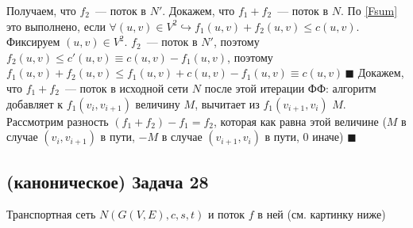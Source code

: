 \documentclass[a4paper]{article}
\begin{document}
Получаем, что $f_2$~--- поток в $N'$. Докажем, что $f_1+f_2$~--- поток в $N$. По \ref{Fsum} это выполнено, если $\forall (u,v)\in V^2\hookrightarrow f_1(u,v)+f_2(u,v)\leqslant c(u,v)$. Фиксируем $(u,v)\in V^2$. $f_2$~--- поток в $N'$, поэтому $f_2(u,v)\leqslant c'(u,v)\equiv c(u,v)-f_1(u,v)$, поэтому $f_1(u,v)+f_2(u,v)\leqslant f_1(u,v)+c(u,v)-f_1(u,v)\equiv c(u,v)\,\blacksquare$\newline
Докажем, что $f_1+f_2$~--- поток в исходной сети $N$ после этой итерации ФФ: алгоритм добавляет к $f_1(v_i,v_{i+1})$ величину $M$, вычитает из $f_1(v_{i+1},v_i)$ $M$. Рассмотрим разность $(f_1+f_2)-f_1=f_2$, которая как равна этой величине ($M$ в случае $(v_i,v_{i+1})$ в пути, $-M$ в случае $(v_{i+1},v_i)$ в пути, $0$ иначе) $\blacksquare$
\subsection*{(каноническое) Задача 28}
Транспортная сеть $N(G(V,E),c,s,t)$ и поток $f$ в ней (см. картинку ниже)\newline
\end{document}
